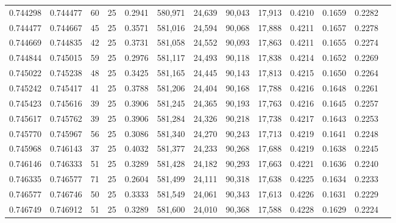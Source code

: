 \begin{tabular}{rrrrrrrrrrrrr}
0.744298 & 0.744477 &    60 &  25 &                                     0.2941 & 580,971 &  24,639 &  90,043 &  17,913 & 0.4210 & 0.1659 & 0.2282 \\
0.744477 & 0.744667 &    45 &  25 &                                     0.3571 & 581,016 &  24,594 &  90,068 &  17,888 & 0.4211 & 0.1657 & 0.2278 \\
0.744669 & 0.744835 &    42 &  25 &                                     0.3731 & 581,058 &  24,552 &  90,093 &  17,863 & 0.4211 & 0.1655 & 0.2274 \\
0.744844 & 0.745015 &    59 &  25 &                                     0.2976 & 581,117 &  24,493 &  90,118 &  17,838 & 0.4214 & 0.1652 & 0.2269 \\
0.745022 & 0.745238 &    48 &  25 &                                     0.3425 & 581,165 &  24,445 &  90,143 &  17,813 & 0.4215 & 0.1650 & 0.2264 \\
0.745242 & 0.745417 &    41 &  25 &                                     0.3788 & 581,206 &  24,404 &  90,168 &  17,788 & 0.4216 & 0.1648 & 0.2261 \\
0.745423 & 0.745616 &    39 &  25 &                                     0.3906 & 581,245 &  24,365 &  90,193 &  17,763 & 0.4216 & 0.1645 & 0.2257 \\
0.745617 & 0.745762 &    39 &  25 &                                     0.3906 & 581,284 &  24,326 &  90,218 &  17,738 & 0.4217 & 0.1643 & 0.2253 \\
0.745770 & 0.745967 &    56 &  25 &                                     0.3086 & 581,340 &  24,270 &  90,243 &  17,713 & 0.4219 & 0.1641 & 0.2248 \\
0.745968 & 0.746143 &    37 &  25 &                                     0.4032 & 581,377 &  24,233 &  90,268 &  17,688 & 0.4219 & 0.1638 & 0.2245 \\
0.746146 & 0.746333 &    51 &  25 &                                     0.3289 & 581,428 &  24,182 &  90,293 &  17,663 & 0.4221 & 0.1636 & 0.2240 \\
0.746335 & 0.746577 &    71 &  25 &                                     0.2604 & 581,499 &  24,111 &  90,318 &  17,638 & 0.4225 & 0.1634 & 0.2233 \\
0.746577 & 0.746746 &    50 &  25 &                                     0.3333 & 581,549 &  24,061 &  90,343 &  17,613 & 0.4226 & 0.1631 & 0.2229 \\
0.746749 & 0.746912 &    51 &  25 &                                     0.3289 & 581,600 &  24,010 &  90,368 &  17,588 & 0.4228 & 0.1629 & 0.2224 \\

\end{tabular}
